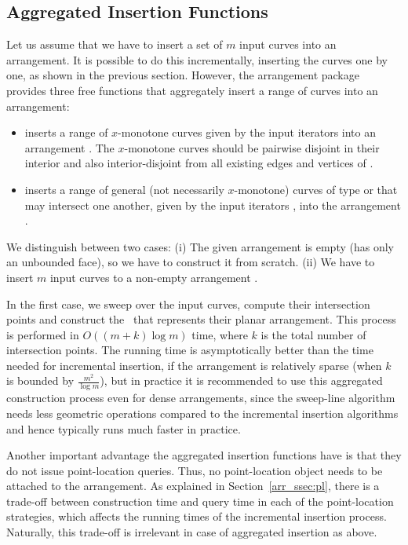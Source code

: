 \subsection{Aggregated Insertion Functions\label{arr_ssec:agg_insert}}

Let us assume that we have to insert a set of $m$ input curves into an
arrangement. It is possible to do this incrementally, 
inserting the curves one by one, as shown in the previous section.
However, the arrangement package provides three free functions that
aggregately insert a range of curves into an arrangement:
%
\begin{itemize}
\item {} inserts 
a range of $x$-monotone curves given by the input iterators
\ccc{[begin, end)} into an arrangement . The $x$-monotone
curves should be pairwise disjoint in their interior and also
interior-disjoint from all existing edges and vertices of .
%
\item {} inserts a range of general
  (not necessarily $x$-monotone) curves of type  or
   that may intersect one another, given by
  the input iterators \ccc{[begin, end)}, into the arrangement
  .
\end{itemize}

We distinguish between two cases: (i) The given arrangement
 is empty (has only an unbounded face), so we have to
construct it from scratch. (ii) We have to insert $m$ input curves
to a non-empty arrangement .

In the first case, we sweep over the input curves, compute
their intersection points and construct the \dcel\ that represents
their planar arrangement. This process is performed in
$O\left((m + k)\log m\right)$ time, where $k$ is the total number
of intersection points. The running time is asymptotically better
than the time needed for incremental insertion, if the arrangement
is relatively sparse (when $k$ is bounded by $\frac{m^2}{\log
m}$), but in practice it is recommended to use this aggregated
construction process even for dense arrangements, since the
sweep-line algorithm needs less geometric operations compared to
the incremental insertion algorithms and hence typically runs 
much faster in practice.

Another important advantage the aggregated insertion functions
have is that they do not issue point-location queries. Thus, no
point-location object needs to be attached to the arrangement. As
explained in Section~\ref{arr_ssec:pl}, there is a trade-off
between construction time and query time in each of the
point-location strategies, which affects the running times of the
incremental insertion process. Naturally, this trade-off is irrelevant
in case of aggregated insertion as above.

